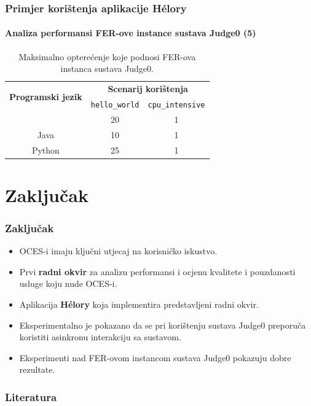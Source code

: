 \documentclass{beamer}
\newif\ifplacelogo
\begin{document}
\begin{frame}
\frametitle{Primjer korištenja aplikacije Hélory}
\framesubtitle{Analiza performansi FER-ove instance sustava Judge0 (5)}
\begin{table}[htb]
\centering
\begin{tabular}[t]{|c|c|c|}
	\hline
	\multirow{2}{*}{\bfseries Programski jezik} & 
	\multicolumn{2}{|c|}{\bfseries Scenarij korištenja}\\ \cline{2-3}
	& \lstinline{hello_world}&\lstinline{cpu_intensive} \\ \hline
	\text{C++} & 20 & 1 \\
	Java & 10 & 1 \\
	Python & 25 & 1 \\
	\hline
\end{tabular}
\caption{Maksimalno opterećenje koje podnosi FER-ova instanca sustava Judge0.}
\end{table}
\end{frame}

\section{Zaključak}
\begin{frame}
\frametitle{Zaključak}
\begin{itemize}
	\item OCES-i imaju ključni utjecaj na korisničko iskustvo.
	\item Prvi \textbf{radni okvir} za analizu performansi i ocjenu kvalitete i pouzdanosti usluge koju nude OCES-i.
	\item Aplikacija \textbf{Hélory} koja implementira predstavljeni radni okvir.
	\item Eksperimentalno je pokazano da se pri korištenju sustava Judge0 preporuča koristiti asinkronu interakciju sa sustavom.
	\item Eksperimenti nad FER-ovom instancom sustava Judge0 pokazuju dobre rezultate.
\end{itemize}
\end{frame}

\placelogofalse
\begin{frame}
\frametitle{Literatura}


\end{frame}
\placelogotrue
\end{document}
